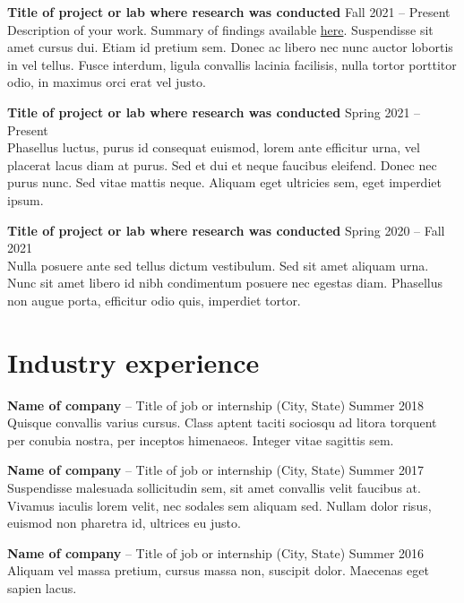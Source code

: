 \documentclass[letterpaper, 12pt]{article}
\begin{document}
\begin{addmargin}[1em]{0em}

\textbf{Title of project or lab where research was conducted} \hfill Fall 2021 -- Present \\
Description of your work. Summary of findings available \href{https://en.wikibooks.org/wiki/LaTeX/Hyperlinks}{here}. Suspendisse sit amet cursus dui. Etiam id pretium sem. Donec ac libero nec nunc auctor lobortis in vel tellus. Fusce interdum, ligula convallis lacinia facilisis, nulla tortor porttitor odio, in maximus orci erat vel justo.

\textbf{Title of project or lab where research was conducted} \hfill Spring 2021 -- Present \\
Phasellus luctus, purus id consequat euismod, lorem ante efficitur urna, vel placerat lacus diam at purus. Sed et dui et neque faucibus eleifend. Donec nec purus nunc. Sed vitae mattis neque. Aliquam eget ultricies sem, eget imperdiet ipsum.

\textbf{Title of project or lab where research was conducted} \hfill Spring 2020 -- Fall 2021 \\
Nulla posuere ante sed tellus dictum vestibulum. Sed sit amet aliquam urna. Nunc sit amet libero id nibh condimentum posuere nec egestas diam. Phasellus non augue porta, efficitur odio quis, imperdiet tortor.

\end{addmargin}


\section*{Industry experience}

\begin{addmargin}[1em]{0em}

\textbf{Name of company} -- Title of job or internship (City, State) \hfill Summer 2018 \\
Quisque convallis varius cursus. Class aptent taciti sociosqu ad litora torquent per conubia nostra, per inceptos himenaeos. Integer vitae sagittis sem. 

\textbf{Name of company} -- Title of job or internship (City, State) \hfill Summer 2017 \\
Suspendisse malesuada sollicitudin sem, sit amet convallis velit faucibus at. Vivamus iaculis lorem velit, nec sodales sem aliquam sed. Nullam dolor risus, euismod non pharetra id, ultrices eu justo. 

\textbf{Name of company} -- Title of job or internship (City, State) \hfill Summer 2016 \\
Aliquam vel massa pretium, cursus massa non, suscipit dolor. Maecenas eget sapien lacus.	

\end{addmargin}
\end{document}
